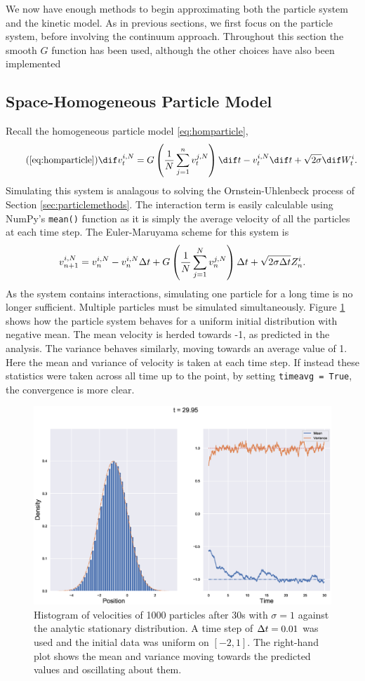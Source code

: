 We now have enough methods to begin approximating both the particle system and the kinetic model. As in previous sections, we first focus on the particle system, before involving the continuum approach. Throughout this section the smooth $G$ function has been used, although the other choices have also been implemented
\subsection{Space-Homogeneous Particle Model}\label{sec:homparticles}
Recall the homogeneous particle model \eqref{eq:homparticle},
\begin{equation}\tag{\ref{eq:homparticle}}
\dif v^{i,N}_t = G\left(\frac{1}{N}\sum_{j=1}^n v^{j,N}_t\right)\dif t-v^{i,N}_t \dif t + \sqrt{2\sigma} \dif W^i_t.
\end{equation}
Simulating this system is analagous to solving the Ornstein-Uhlenbeck process of Section \ref{sec:particlemethods}. The interaction term is easily calculable using NumPy's \texttt{mean()} function as it is simply the average velocity of all the particles at each time step. The Euler-Maruyama scheme for this system is
\[ v^{i,N}_{n+1} = v^{i,N}_n - v^{i,N}_n\Delta t + G\left(\frac{1}{N}\sum_{j=1}^N v^{j,N}_n\right)\Delta t+ \sqrt{2\sigma\Delta t} Z^i_n. \]
As the system contains interactions, simulating one particle for a long time is no longer sufficient. Multiple particles must be simulated simultaneously. Figure \ref{fig:homparticlemoments} shows how the particle system behaves for a uniform initial distribution with negative mean. The mean velocity is herded towards -1, as predicted in the analysis. The variance behaves similarly, moving towards an average value of 1. Here the mean and variance of velocity is taken at each time step. If instead these statistics were taken across all time up to the point, by setting \texttt{timeavg = True}, the convergence is more clear.
\begin{figure}
    \centering
    \includegraphics[width=\linewidth]{Figures/homparticles}
    \caption[Homogeneous Particle System]{Histogram of velocities of 1000 particles after 30s with $\sigma = 1$ against the analytic stationary distribution. A time step of $\Delta t = 0.01$ was used and the initial data was uniform on $[-2,1]$. The right-hand plot shows the mean and variance moving towards the predicted values and oscillating about them.}
    \label{fig:homparticlemoments}
\end{figure}
